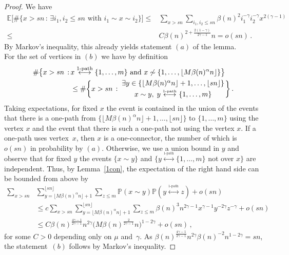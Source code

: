 \documentclass[12pt,a4paper]{article}
\numberwithin{equation}{section}
\begin{document}
\begin{proof}
    We have 
    \begin{align*}
        \mathbb E\big[\#\{x>sn\,:\,\exists i_1,i_2\le sn \text{ with }i_1\sim x\sim i_2\}\big]\le & \sum_{x>sn}\sum_{i_1,i_2\le sn}\beta(n)^2 i_1^{-\gamma}i_2^{-\gamma}x^{2(\gamma-1)}
        \\ \le & C \beta(n)^{2+\tfrac{2(1-\gamma)}{2\gamma-1}}n =o(sn)\,.
    \end{align*}
    By Markov's inequality, this already yields statement $(a)$ of the lemma.\smallskip \\
    \noindent    For the set of vertices in $(b)$ we have by definition
    \begin{align*}
        \#\big\{x>sn\,:\, & x\overset{1\text{-path}}{\longleftrightarrow}\{1,\dots,m\} \text{ and } x\not\sim \{1,\dots, \lfloor M \beta(n)^{\alpha}n\rfloor\}\big\}
       \\ &  \le  \#\bigg\{x>sn\,:\,{\exists y\in\{\lfloor M \beta(n)^{\alpha}n\rfloor+1,\dots,\lfloor sn \rfloor\} \atop x\sim y, \;y\overset{_{1\text{-path}}}{\longleftrightarrow}\{1,\dots,m\}} \bigg\} \,.
    \end{align*}
    Taking expectations, for fixed $x$ the event  
is contained in the union of the  events that there is a one-path from
    $\{\lfloor M \beta(n)^{\alpha}n\rfloor+1,\dots,\lfloor sn \rfloor \}$ to $\{1,\dots,m\}$ using the vertex $x$ and the event that there is such a one-path not using the vertex $x$. If a one-path uses vertex~$x$, then $x$ is a one-connector, the number of which is $o(sn)$ in probability by $(a)$. Otherwise, we use a union bound in $y$ and observe that for fixed $y$ the events $\{x\sim y \}$ and $\{y\overset{_{1\text{-path}}}{\longleftrightarrow}\{1,\dots,m\}$ not over $x\}$ are independent.
    Thus, by Lemma~\ref{1con}, the expectation of the right hand side can be bounded from above by 
    \begin{align*}
        \sum_{x>sn}  & \sum_{y=\lfloor M \beta(n)^{\alpha}n\rfloor+1}^{\lfloor sn \rfloor}\sum_{z\le m} \mathbb P(x\sim y)\mathbb P(y\overset{_{1\text{-path}}}{\longleftrightarrow}z) + o(sn)
      \\ & \le  c\sum_{x>sn} \sum_{y=\lfloor M \beta(n)^{\alpha}n\rfloor+1}^{\lfloor sn \rfloor}\sum_{z\le m}\beta(n)^3n^{2\gamma-1}x^{\gamma-1}y^{-2\gamma}z^{-\gamma} +o(sn)
      \\ & \le C\beta(n)^{\tfrac{4\gamma-1}{2\gamma-1}}n^{2\gamma}\big(M  \beta(n)^{\tfrac{2}{2\gamma-1}}n\big)^{1-2\gamma}+o(sn)\,,
    \end{align*}
    for some $C>0$ depending only on  $\mu$ and~$\gamma$.
    As
    $\beta(n)^{\tfrac{4\gamma-1}{2\gamma-1}}n^{2\gamma} \beta(n)^{-2}n^{1-2\gamma}=sn$,
    the statement~$(b)$ follows by Markov's inequality.
\end{proof}
\end{document}
